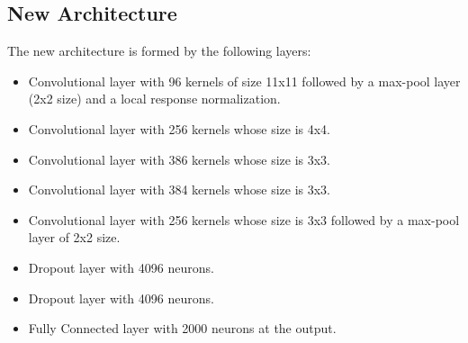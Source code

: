 
\subsection{New Architecture} \label{subsec:ejecucion1}
The new architecture is formed by the following layers:
\begin{itemize}[itemsep=2pt,topsep=8pt,parsep=0pt,partopsep=20pt]
\item Convolutional layer with 96 kernels of size 11x11 followed by a max-pool layer (2x2 size) and a local response normalization.
\item Convolutional layer with 256 kernels whose size is 4x4.
\item Convolutional layer with 386 kernels whose size is 3x3.
\item Convolutional layer with 384 kernels whose size is 3x3.
\item Convolutional layer with 256 kernels whose size is 3x3 followed by a max-pool layer of 2x2 size.
\item Dropout layer with 4096 neurons.
\item Dropout layer with 4096 neurons.
\item Fully Connected layer with 2000 neurons at the output.
\end{itemize}

